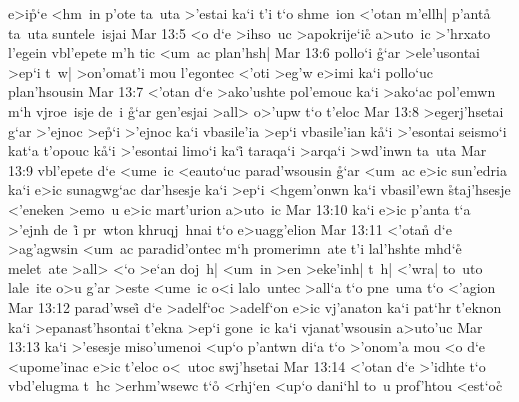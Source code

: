 e>i\r{p}`e
<hm~in
p'ote
ta~uta
>'estai
ka`i
t'i
t`o
shme~ion
<'otan
m'ellh|
p'anta\r{}
ta~uta
suntele~isjai\bibvsend
\vs Mar 13:5
<o
d`e
>ihso~uc
>apokrije`ic\r{}
a>uto~ic
>'hrxato
l'egein
vbl'epete
m'h
tic
<um~ac
plan'hsh|\bibvsend
\vs Mar 13:6
pollo`i
\r{g}`ar
>ele'usontai
>ep`i
t~w|
>on'omat'i
mou
l'egontec
<'oti
>eg'w
e>imi
ka`i
pollo`uc
plan'hsousin\bibvsend
\vs Mar 13:7
<'otan
d`e
>ako'ushte
pol'emouc
ka`i
>ako`ac
pol'emwn
m`h
vjroe~isje
de~i
\r{g}`ar
gen'esjai
>all>
o>'upw
t`o
t'eloc\bibvsend
\vs Mar 13:8
>egerj'hsetai
g`ar
>'ejnoc
>e\r{p}`i
>'ejnoc
ka`i
vbasile'ia
>ep`i
vbasile'ian
k\r{a}`i
>'esontai
seismo`i
kat`a
t'opouc
k\r{a}`i
>'esontai
limo`i
ka`i\r{}
taraqa`i
>arqa`i
>wd'inwn
ta~uta\bibvsend
\vs Mar 13:9
vbl'epete
d`e
<ume~ic
<eauto`uc
parad'wsousin
\r{g}`ar
<um~ac
e>ic
sun'edria
ka`i
e>ic
sunagwg`ac
dar'hsesje
ka`i
>ep`i
<hgem'onwn
ka`i
vbasil'ewn
\r{s}taj'hsesje
<'eneken
>emo~u
e>ic
mart'urion
a>uto~ic\bibvsend
\vs Mar 13:10
ka`i
e>ic
p'anta
t`a
>'ejnh
de~i\r{}
pr~wton
khruqj~hnai
t`o
e>uagg'elion\bibvsend
\vs Mar 13:11
<'otan\r{}
d`e
>ag'agwsin
<um~ac
paradid'ontec
m`h
promerimn~ate
t'i
lal'hshte
mhd`e\r{}
melet~ate
>all>
<`o
>e`an
doj~h|
<um~in
>en
>eke'inh|
t~h|
<'wra|
to~uto
lale~ite
o>u
g'ar
>este
<ume~ic
o<i
lalo~untec
>all`a
t`o
pne~uma
t`o
<'agion\bibvsend
\vs Mar 13:12
parad'wsei\r{}
d`e
>adelf`oc
>adelf`on
e>ic
vj'anaton
ka`i
pat`hr
t'eknon
ka`i
>epanast'hsontai
t'ekna
>ep`i
gone~ic
ka`i
vjanat'wsousin
a>uto'uc\bibvsend
\vs Mar 13:13
ka`i
>'esesje
miso'umenoi
<up`o
p'antwn
di`a
t`o
>'onom'a
mou
<o
d`e
<upome'inac
e>ic
t'eloc
o<~utoc
swj'hsetai\bibvsend
\vs Mar 13:14
<'otan
d`e
>'idhte
t`o
vbd'elugma
t~hc
>erhm'wsewc
t`o\r{}
<rhj`en
<up`o
dani`hl
to~u
prof'htou
<est`o\r{c}
